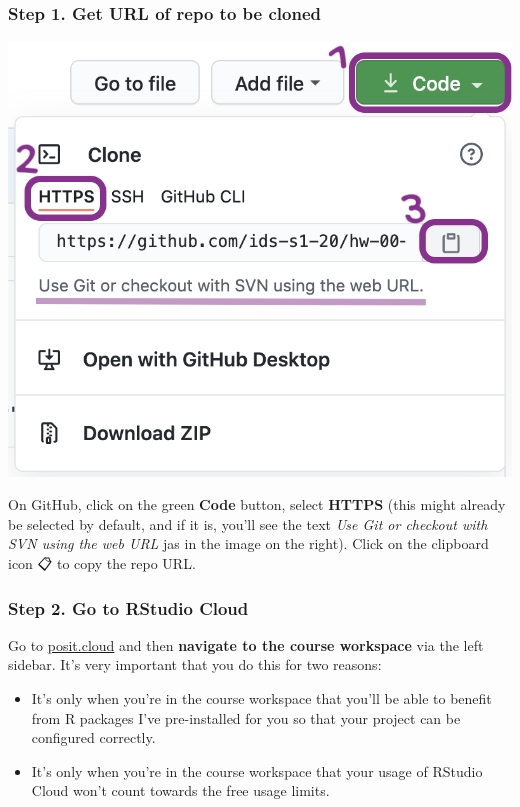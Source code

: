 \documentclass[
]{article}
\providecommand{\tightlist}{%
  \setlength{\itemsep}{0pt}\setlength{\parskip}{0pt}}
\begin{document}
\subsubsection{Step 1. Get URL of repo to be
cloned}\label{step-1.-get-url-of-repo-to-be-cloned}

\includegraphics[width=0.8\linewidth]{img/clone-repo-link}

On GitHub, click on the green \textbf{Code} button, select
\textbf{HTTPS} (this might already be selected by default, and if it is,
you'll see the text \emph{Use Git or checkout with SVN using the web
URL} jas in the image on the right). Click on the clipboard icon 📋 to
copy the repo URL.

\subsubsection{Step 2. Go to RStudio
Cloud}\label{step-2.-go-to-rstudio-cloud}

Go to \href{https://posit.cloud/}{posit.cloud} and then \textbf{navigate
to the course workspace} via the left sidebar. It's very important that
you do this for two reasons:

\begin{itemize}
\tightlist
\item
  It's only when you're in the course workspace that you'll be able to
  benefit from R packages I've pre-installed for you so that your
  project can be configured correctly.
\item
  It's only when you're in the course workspace that your usage of
  RStudio Cloud won't count towards the free usage limits.
\end{itemize}
\end{document}
